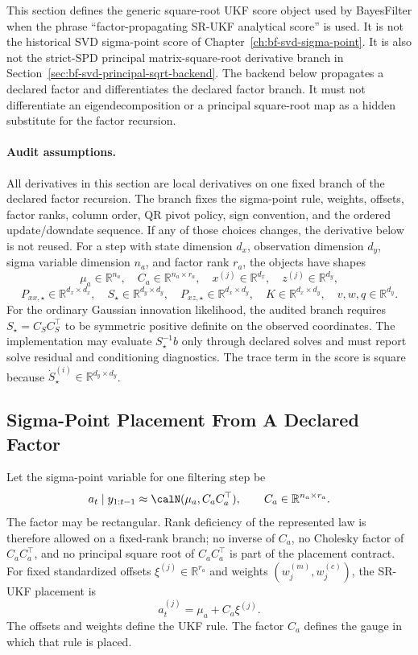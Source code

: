 This section defines the generic square-root UKF score object used by
BayesFilter when the phrase ``factor-propagating SR-UKF analytical score'' is
used.  It is not the historical SVD sigma-point score of
Chapter~\ref{ch:bf-svd-sigma-point}.  It is also not the strict-SPD principal
matrix-square-root derivative branch in
Section~\ref{sec:bf-svd-principal-sqrt-backend}.  The backend below propagates a
declared factor and differentiates the declared factor branch.  It must not
differentiate an eigendecomposition or a principal square-root map as a hidden
substitute for the factor recursion.

\paragraph{Audit assumptions.}
\label{par:bf-srukf-audit-assumptions}
All derivatives in this section are local derivatives on one fixed branch of
the declared factor recursion.  The branch fixes the sigma-point rule, weights,
offsets, factor ranks, column order, QR pivot policy, sign convention, and the
ordered update/downdate sequence.  If any of those choices changes, the
derivative below is not reused.  For a step with state dimension \(d_x\),
observation dimension \(d_y\), sigma variable dimension \(n_a\), and factor
rank \(r_a\), the objects have shapes
\[
  \mu_a\in\mathbb R^{n_a},\quad
  C_a\in\mathbb R^{n_a\times r_a},\quad
  x^{(j)}\in\mathbb R^{d_x},\quad
  z^{(j)}\in\mathbb R^{d_y},
\]
\[
  P_{xx,\star}\in\mathbb R^{d_x\times d_x},\quad
  S_\star\in\mathbb R^{d_y\times d_y},\quad
  P_{xz,\star}\in\mathbb R^{d_x\times d_y},\quad
  K\in\mathbb R^{d_x\times d_y},\quad
  v,w,q\in\mathbb R^{d_y}.
\]
For the ordinary Gaussian innovation likelihood, the audited branch requires
\(S_\star=C_SC_S^\top\) to be symmetric positive definite on the observed
coordinates.  The implementation may evaluate \(S_\star^{-1}b\) only through
declared solves and must report solve residual and conditioning diagnostics.
The trace term in the score is square because
\(\dot S_\star^{(i)}\in\mathbb R^{d_y\times d_y}\).

\subsection{Sigma-Point Placement From A Declared Factor}
\label{sec:bf-srukf-factor-placement}

Let the sigma-point variable for one filtering step be
\[
  a_t\mid y_{1:t-1}\approx \calN(\mu_a,C_aC_a^\top),
  \qquad
  C_a\in\mathbb R^{n_a\times r_a}.
\]
The factor may be rectangular.  Rank deficiency of the represented law is
therefore allowed on a fixed-rank branch; no inverse of \(C_a\), no Cholesky
factor of \(C_aC_a^\top\), and no principal square root of \(C_aC_a^\top\) is
part of the placement contract.  For fixed standardized offsets
\(\xi^{(j)}\in\mathbb R^{r_a}\) and weights
\((w_j^{(m)},w_j^{(c)})\), the SR-UKF placement is
\begin{equation}
\label{eq:bf-srukf-factor-placement}
  a_t^{(j)}=\mu_a+C_a\xi^{(j)} .
\end{equation}
The offsets and weights define the UKF rule.  The factor \(C_a\) defines the
gauge in which that rule is placed.

